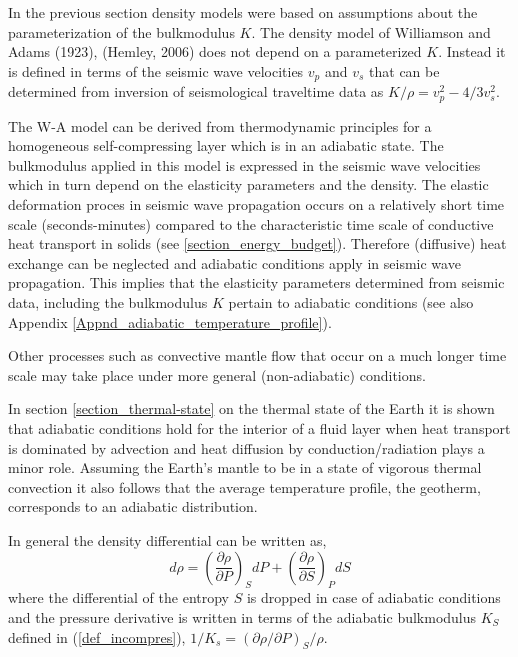 
In the previous section density models were based on 
assumptions about the parameterization of the bulkmodulus $K$.
The density model of Williamson and Adams (1923), (Hemley, 2006)
does not depend on a parameterized $K$. 
Instead it is defined in terms of the seismic wave velocities
$v_p$ and $v_s$ that can be determined from inversion of seismological
traveltime data as $K/\rho = v_p^2 - 4/3 v_s^2$.

The W-A model can be derived from thermodynamic principles
for a homogeneous self-compressing
layer which is in an adiabatic state.
The bulkmodulus applied in this model is expressed in the seismic
wave velocities which in turn depend on the elasticity parameters
and the density.
The elastic deformation proces in seismic wave propagation occurs
on a relatively short time scale (seconds-minutes) compared to the 
characteristic time scale of conductive heat transport in solids
(see \ref{section_energy_budget}).
Therefore (diffusive) heat exchange can be neglected and adiabatic
conditions apply in seismic wave propagation.  
This implies that the elasticity parameters determined from 
seismic data, including the bulkmodulus $K$ pertain to adiabatic
conditions (see also Appendix \ref{Appnd_adiabatic_temperature_profile}).

Other processes such as convective mantle flow that occur on
a much longer time scale may take place under more general
(non-adiabatic) conditions.

In section \ref{section_thermal-state} on the thermal state of the Earth 
it is shown that
adiabatic conditions hold for the interior of a fluid layer when heat 
transport is dominated by advection and heat diffusion by
conduction/radiation plays a minor role.
Assuming the Earth's mantle to be in a state of vigorous thermal
convection it also follows that the average temperature profile, 
the geotherm, corresponds to an adiabatic distribution.

In general the density differential can be written as,
\begin{equation}
d\rho = \left ( \frac{\partial \rho}{\partial P} \right )_S dP +
        \left ( \frac{\partial \rho}{\partial S} \right )_P dS
\label{eqn_density_differential}
\end{equation}
where the differential of the entropy $S$ is dropped in case of
adiabatic conditions and the pressure derivative is written in terms of the
adiabatic bulkmodulus $K_S$ defined in (\ref{def_incompres}),
$1/K_s =  \left ( \partial \rho/\partial P \right )_S / \rho$.


